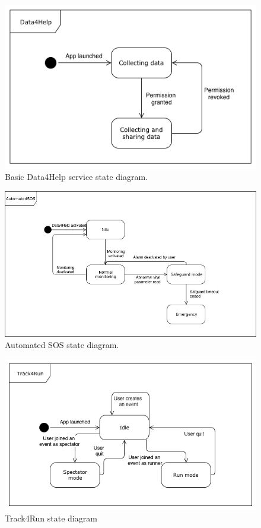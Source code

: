 \documentclass{article}
\begin{document}
\begin{figure}[h!]
  \includegraphics[width=\textwidth]{Figures/State1}
  \caption{Basic Data4Help service state diagram.}
  \label{fig:State1}
\end{figure}

\begin{figure}[h!]
	\includegraphics[width=\textwidth]{Figures/State2}
  \caption{Automated SOS state diagram.}
  \label{fig:State2}
\end{figure}

\newpage

\begin{figure}[h!]
  \includegraphics[width=\textwidth]{Figures/State3}
  \caption{Track4Run state diagram}
  \label{fig:State3.}
\end{figure}
\end{document}
